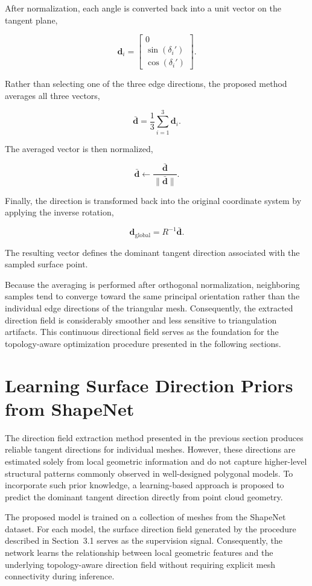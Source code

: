 \documentclass[../main.tex]{subfiles}
\begin{document}
After normalization, each angle is converted back into a unit vector on the tangent plane,

\[
\mathbf{d}_i
=
\begin{bmatrix}
	0\\
	\sin(\delta_i')\\
	\cos(\delta_i')
\end{bmatrix}.
\]

Rather than selecting one of the three edge directions, the proposed method averages all three vectors,

\[
\bar{\mathbf{d}}
=
\frac{1}{3}
\sum_{i=1}^{3}
\mathbf{d}_i.
\]

The averaged vector is then normalized,

\[
\bar{\mathbf{d}}
\leftarrow
\frac{\bar{\mathbf{d}}}
{\|\bar{\mathbf{d}}\|}.
\]

Finally, the direction is transformed back into the original coordinate system by applying the inverse rotation,

\[
\mathbf{d}_{\mathrm{global}}
=
R^{-1}
\bar{\mathbf{d}}.
\]

The resulting vector defines the dominant tangent direction associated with the sampled surface point.

Because the averaging is performed after orthogonal normalization, neighboring samples tend to converge toward the same principal orientation rather than the individual edge directions of the triangular mesh. Consequently, the extracted direction field is considerably smoother and less sensitive to triangulation artifacts. This continuous directional field serves as the foundation for the topology-aware optimization procedure presented in the following sections.

\section{Learning Surface Direction Priors from ShapeNet}
\label{sec:extract_topology}

The direction field extraction method presented in the previous section produces reliable tangent directions for individual meshes. However, these directions are estimated solely from local geometric information and do not capture higher-level structural patterns commonly observed in well-designed polygonal models. To incorporate such prior knowledge, a learning-based approach is proposed to predict the dominant tangent direction directly from point cloud geometry.

The proposed model is trained on a collection of meshes from the ShapeNet dataset. For each model, the surface direction field generated by the procedure described in Section~3.1 serves as the supervision signal. Consequently, the network learns the relationship between local geometric features and the underlying topology-aware direction field without requiring explicit mesh connectivity during inference.
\end{document}
